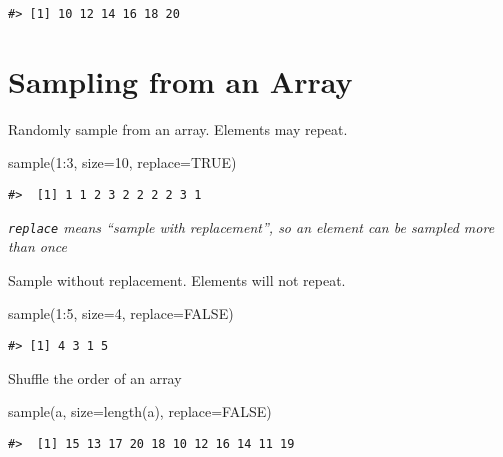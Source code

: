 \documentclass[
]{book}
\newenvironment{Shaded}{\begin{snugshade}}{\end{snugshade}}
\newcommand{\AttributeTok}[1]{\textcolor[rgb]{0.77,0.63,0.00}{#1}}
\newcommand{\ConstantTok}[1]{\textcolor[rgb]{0.00,0.00,0.00}{#1}}
\newcommand{\DecValTok}[1]{\textcolor[rgb]{0.00,0.00,0.81}{#1}}
\newcommand{\FunctionTok}[1]{\textcolor[rgb]{0.00,0.00,0.00}{#1}}
\newcommand{\NormalTok}[1]{#1}
\newcommand{\SpecialCharTok}[1]{\textcolor[rgb]{0.00,0.00,0.00}{#1}}
\begin{document}
\begin{verbatim}
#> [1] 10 12 14 16 18 20
\end{verbatim}

\hypertarget{sampling-from-an-array}{%
\section{Sampling from an Array}\label{sampling-from-an-array}}

Randomly sample from an array. Elements may repeat.

\begin{Shaded}
\begin{Highlighting}[]
\FunctionTok{sample}\NormalTok{(}\DecValTok{1}\SpecialCharTok{:}\DecValTok{3}\NormalTok{, }\AttributeTok{size=}\DecValTok{10}\NormalTok{, }\AttributeTok{replace=}\ConstantTok{TRUE}\NormalTok{)}
\end{Highlighting}
\end{Shaded}

\begin{verbatim}
#>  [1] 1 1 2 3 2 2 2 2 3 1
\end{verbatim}

\emph{\texttt{replace} means ``sample with replacement'', so an element can be sampled more than once}

Sample without replacement. Elements will not repeat.

\begin{Shaded}
\begin{Highlighting}[]
\FunctionTok{sample}\NormalTok{(}\DecValTok{1}\SpecialCharTok{:}\DecValTok{5}\NormalTok{, }\AttributeTok{size=}\DecValTok{4}\NormalTok{, }\AttributeTok{replace=}\ConstantTok{FALSE}\NormalTok{)}
\end{Highlighting}
\end{Shaded}

\begin{verbatim}
#> [1] 4 3 1 5
\end{verbatim}

Shuffle the order of an array

\begin{Shaded}
\begin{Highlighting}[]
\FunctionTok{sample}\NormalTok{(a, }\AttributeTok{size=}\FunctionTok{length}\NormalTok{(a), }\AttributeTok{replace=}\ConstantTok{FALSE}\NormalTok{)}
\end{Highlighting}
\end{Shaded}

\begin{verbatim}
#>  [1] 15 13 17 20 18 10 12 16 14 11 19
\end{verbatim}
\end{document}
